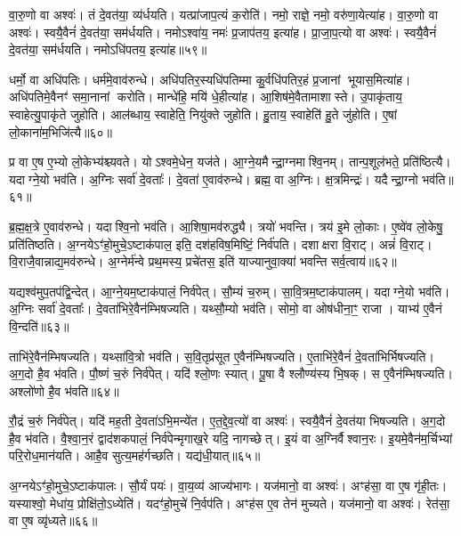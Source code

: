 वा॒रु॒णो वा अश्वः॑।
तं दे॒वत॑या॒ व्य॑र्धयति।
यत्प्रा॑जाप॒त्यं क॒रोति॑।
नमो॒ राज्ञे॒ नमो॒ वरु॑णा॒येत्या॑ह।
वा॒रु॒णो वा अश्वः॑।
स्वयै॒वैनं॑ दे॒वत॑या॒ सम॑र्धयति।
नमोऽश्वा॑य॒ नमः॑ प्र॒जाप॑तय॒ इत्या॑ह।
प्रा॒जा॒प॒त्यो वा अश्वः॑।
स्वयै॒वैनं॑ दे॒वत॑या॒ सम॑र्धयति।
नमोऽधि॑पतय॒ इत्या॑ह॥५९॥

धर्मो॒ वा अधि॑पतिः।
धर्म॑मे॒वाव॑रुन्धे।
अधि॑पतिर॒स्यधि॑पतिम्मा कु॒र्वधि॑पतिर॒हं प्र॒जानां भूयास॒मित्या॑ह।
अधि॑पतिमे॒वैनꣳ॑ समा॒नानां करोति।
मान्धे॑हि॒ मयि॑ धे॒हीत्या॑ह।
आ॒शिष॑मे॒वैतामाशास्ते।
उ॒पाकृ॑ताय॒ स्वाहेत्यु॒पाकृ॑ते जुहोति।
आल॑ब्धाय॒ स्वाहेति॒ नियु॑क्ते जुहोति।
हु॒ताय॒ स्वाहेति॑ हु॒ते जु॑होति।
ए॒षां लो॒काना॑म॒भिजि॑त्यै॥६०॥

प्र वा ए॒ष ए॒भ्यो लो॒केभ्य॑श्च्यवते।
योऽश्वमे॒धेन॒ यज॑ते।
आ॒ग्ने॒यमैन्द्रा॒ग्नमाश्वि॒नम्।
तान्प॒शूल॑भते॒ प्रति॑ष्ठित्यै।
यदाग्ने॒यो भव॑ति।
अ॒ग्निः सर्वा॑ दे॒वताः᳚।
दे॒वता॑ ए॒वाव॑रुन्धे।
ब्रह्म॒ वा अ॒ग्निः।
क्ष॒त्रमिन्द्रः॑।
यदैन्द्रा॒ग्नो भव॑ति॥६१॥

ब्र॒ह्म॒क्ष॒त्रे ए॒वाव॑रुन्धे।
यदाश्वि॒नो भव॑ति।
आ॒शिषा॒मव॑रुद्ध्यै।
त्रयो॑ भवन्ति।
त्रय॑ इ॒मे लो॒काः।
ए॒ष्वे॑व लो॒केषु॒ प्रति॑तिष्ठति।
अ॒ग्नये\-ऽꣳ॑हो॒मुचे॒\-ऽष्टाक॑पाल॒ इति॒ दश॑हविष॒मिष्टिं॒ निर्व॑पति।
दशाक्षरा वि॒राट्।
अन्नं॑ वि॒राट्।
वि॒राजै॒वान्नाद्य॒मव॑रुन्धे।
अ॒ग्नेर्म॑न्वे प्रथ॒मस्य॒ प्रचे॑तस॒ इति॑ याज्यानुवा॒क्या॑ भवन्ति सर्व॒त्वाय॑॥६२॥\anuvakamend[अधि॑पतय॒ इत्या॑हा॒भि॑जित्या ऐन्द्रा॒ग्नो भव॑ति रुन्ध॒ एकं॑ च]

यद्यश्व॑मुप॒तप॑द्वि॒न्देत्।
आ॒ग्ने॒यम॒ष्टाक॑पालं॒ निर्व॑पेत्।
सौ॒म्यं च॒रुम्।
सा॒वि॒त्रम॒ष्टाक॑पालम्।
यदाग्ने॒यो भव॑ति।
अ॒ग्निः सर्वा॑ दे॒वताः᳚।
दे॒वता॑भिरे॒वैन॑म्भिषज्यति।
यथ्सौ॒म्यो भव॑ति।
सोमो॒ वा ओष॑धीना॒ꣳ॒ राजा।
याभ्य॑ ए॒वैनं वि॒न्दति॑॥६३॥

ताभि॑रे॒वैन॑म्भिषज्यति।
यथ्सा॑वि॒त्रो भव॑ति।
स॒वि॒तृप्र॑सूत ए॒वैन॑म्भिषज्यति।
ए॒ताभि॑रे॒वैनं॑ दे॒वता॑भिर्भिषज्यति।
अ॒ग॒दो है॒व भ॑वति।
पौ॒ष्णं च॒रुं निर्व॑पेत्।
यदि॑ श्लो॒णः स्यात्।
पू॒षा वै श्लौण्य॑स्य भि॒षक्।
स ए॒वैन॑म्भिषज्यति।
अश्लो॑णो है॒व भ॑वति॥६४॥

रौ॒द्रं च॒रुं निर्व॑पेत्।
यदि॑ मह॒ती दे॒वता॑\-ऽभि॒मन्ये॑त।
ए॒त॒द्दे॒व॒त्यो॑ वा अश्वः॑।
स्वयै॒वैनं॑ दे॒वत॑या भिषज्यति।
अ॒ग॒दो है॒व भ॑वति।
वै॒श्वा॒न॒रं द्वाद॑शकपालं॒ निर्व॑पेन्मृगाख॒रे यदि॒ नागच्छेत्।
इ॒यं वा अ॒ग्निर्वैश्वान॒रः।
इ॒यमे॒वैन॑म॒र्चिभ्यां परि॒रोध॒मान॑यति।
आहै॒व सुत्य॒मह॑र्गच्छति।
यद्य॑धी॒यात्॥६५॥

अ॒ग्नये\-ऽꣳ॑हो॒मुचे॒\-ऽष्टाक॑पालः।
सौ॒र्यं पयः॑।
वा॒य॒व्य॑ आज्य॑भागः।
यज॑मानो॒ वा अश्वः॑।
अꣳह॑सा॒ वा ए॒ष गृ॑ही॒तः।
यस्याश्वो॒ मेधा॑य॒ प्रोक्षि॑तो॒\-ऽध्येति॑।
यदꣳ॑हो॒मुचे॑ नि॒र्वप॑ति।
अꣳह॑स ए॒व तेन॑ मुच्यते।
यज॑मानो॒ वा अश्वः॑।
रेत॑सा॒ वा ए॒ष व्यृ॑ध्यते॥६६॥

